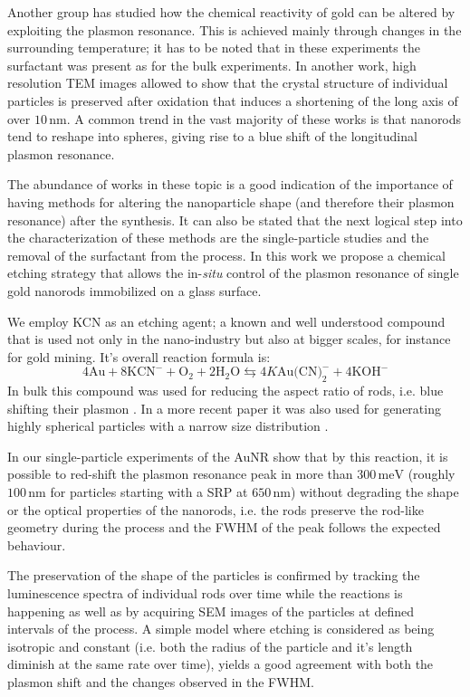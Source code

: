 \documentclass{article}
\begin{document}
Another group has studied how the chemical reactivity of gold \cite{Ni2012} can
be altered by exploiting the plasmon resonance. This is achieved mainly through
changes in the surrounding temperature; it has to be noted that in these
experiments the surfactant was present as for the bulk experiments. In another
work\cite{Tsung2006}, high resolution TEM images allowed to show that the
crystal structure of individual particles is preserved after oxidation that
induces a shortening of the long axis of over $10\,\textrm{nm}$. A common trend
in the vast majority of these works is that nanorods tend to reshape into
spheres, giving rise to a blue shift of the longitudinal plasmon resonance.

The abundance of works in these topic is a good indication of the importance of
having methods for altering the nanoparticle shape (and therefore their plasmon
resonance) after the synthesis. It can also be stated that the next logical step
into the characterization of these methods are the single-particle studies and
the removal of the surfactant from the process. In this work we propose a
chemical etching strategy that allows the in-\textit{situ} control of the
plasmon resonance of single gold nanorods immobilized on a glass surface.

We employ KCN as an etching agent; a known and well understood compound that is
used not only in the nano-industry but also at bigger scales, for instance for
gold mining. It's overall reaction formula is:
\begin{equation*}
4\textrm{Au} + 8\textrm{KCN}^-+\textrm{O}_2 + 2\textrm{H}_2\textrm{O}
\leftrightarrows 4K\textrm{Au(CN)}_2^-+4\textrm{KOH}^-
\end{equation*}
In bulk this compound was used for reducing the aspect ratio of rods, i.e.
blue shifting their plasmon \cite{Jana2002}. In a more recent paper it was also
used for generating highly spherical particles with a narrow size
distribution \cite{Lee2013}. 

In our single-particle experiments of the AuNR show that by this reaction, it is
possible to red-shift the plasmon resonance peak in more than
$300\,\textrm{meV}$ (roughly $100\,\textrm{nm}$ for particles starting with a
SRP at $650\,\textrm{nm}$) without degrading the shape or the optical properties
of the nanorods, i.e. the rods preserve the rod-like geometry during the process
and the FWHM of the peak follows the expected behaviour.

The preservation of the shape of the particles is confirmed by tracking the
luminescence spectra of individual rods over time while the reactions is
happening as well as by acquiring SEM images of the particles at defined
intervals of the process. A simple model where etching is considered as being
isotropic and constant (i.e. both the radius of the particle and it's length
diminish at the same rate over time), yields a good agreement with both the
plasmon shift and the changes observed in the FWHM. 
\end{document}
